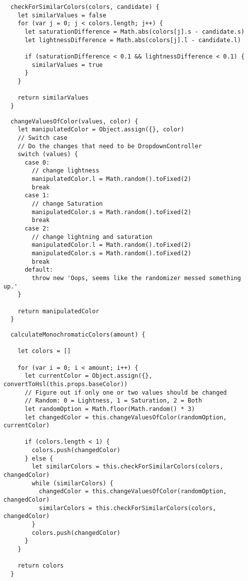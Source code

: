 \begin{lstlisting}
  checkForSimilarColors(colors, candidate) {
    let similarValues = false
    for (var j = 0; j < colors.length; j++) {
      let saturationDifference = Math.abs(colors[j].s - candidate.s)
      let lightnessDifference = Math.abs(colors[j].l - candidate.l)

      if (saturationDifference < 0.1 && lightnessDifference < 0.1) {
        similarValues = true
      }
    }

    return similarValues
  }
\end{lstlisting}

\begin{lstlisting}
  changeValuesOfColor(values, color) {
    let manipulatedColor = Object.assign({}, color)
    // Switch case
    // Do the changes that need to be DropdownController
    switch (values) {
      case 0:
        // change lightness
        manipulatedColor.l = Math.random().toFixed(2)
        break
      case 1:
        // change Saturation
        manipulatedColor.s = Math.random().toFixed(2)
        break
      case 2:
        // change lightning and saturation
        manipulatedColor.l = Math.random().toFixed(2)
        manipulatedColor.s = Math.random().toFixed(2)
        break
      default:
        throw new 'Oops, seems like the randomizer messed something up.'
    }

    return manipulatedColor
  }
\end{lstlisting}

\begin{lstlisting}
  calculateMonochromaticColors(amount) {

    let colors = []

    for (var i = 0; i < amount; i++) {
      let currentColor = Object.assign({}, convertToHsl(this.props.baseColor))
      // Figure out if only one or two values should be changed
      // Random: 0 = Lightness, 1 = Saturation, 2 = Both
      let randomOption = Math.floor(Math.random() * 3)
      let changedColor = this.changeValuesOfColor(randomOption, currentColor)

      if (colors.length < 1) {
        colors.push(changedColor)
      } else {
        let similarColors = this.checkForSimilarColors(colors, changedColor)
        while (similarColors) {
          changedColor = this.changeValuesOfColor(randomOption, changedColor)
          similarColors = this.checkForSimilarColors(colors, changedColor)
        }
        colors.push(changedColor)
      }
    }

    return colors
  }
\end{lstlisting}

